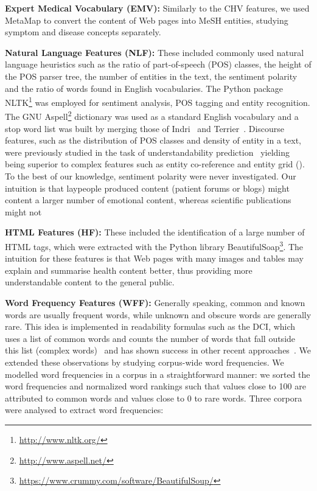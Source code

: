 \textbf{Expert Medical Vocabulary (EMV):}
Similarly to the CHV features, we used MetaMap to convert the content of Web pages into MeSH entities, studying symptom and disease concepts separately. 

\textbf{Natural Language Features (NLF):}
These included commonly used natural language heuristics such as the ratio of part-of-speech (POS) classes, the height of the POS parser tree, the number of entities in the text, 
the sentiment polarity and the ratio of words found in English vocabularies. The Python package NLTK\footnote{\url{http://www.nltk.org/}} was employed for sentiment analysis, POS tagging and entity recognition. The GNU Aspell\footnote{\url{http://www.aspell.net/}} dictionary was used as a standard English vocabulary and a stop word list was built by merging those of Indri~\cite{indri} and Terrier~\cite{terrier}. Discourse features, such as the distribution of POS classes and density of entity in a text, were previously studied in the task of understandability prediction~\cite{feng10} yielding being superior to complex features such as entity co-reference and entity grid (\cite{barzilay08}). To the best of our knowledge, sentiment polarity were never investigated. Our intuition is that laypeople produced content (patient forums or blogs) might content a larger number of emotional content, whereas scientific publications might not

\textbf{HTML Features (HF):}
These included the identification of a large number of HTML tags, which were extracted with the Python library BeautifulSoap\footnote{\url{https://www.crummy.com/software/BeautifulSoup/}}. The intuition for these features is that Web pages with many images and tables may explain and summarise health content better, thus providing more understandable content to the general public. 

\textbf{Word Frequency Features (WFF):}
Generally speaking, common and known words are usually frequent words, while unknown and obscure words are generally rare. This idea  is implemented in readability formulas such as the DCI, which uses a list of common words and counts the number of words that fall outside this list (complex words)~\cite{dale48} and has shown success in other recent approaches~\cite{elhadad06,wu15}.
We extended these observations by studying corpus-wide word frequencies. 
We modelled word frequencies in a corpus in a straightforward manner: we sorted the word frequencies and normalized word rankings such that values close to 100 are attributed to common words and values close to 0 to rare words. Three corpora were analysed to extract word frequencies:

